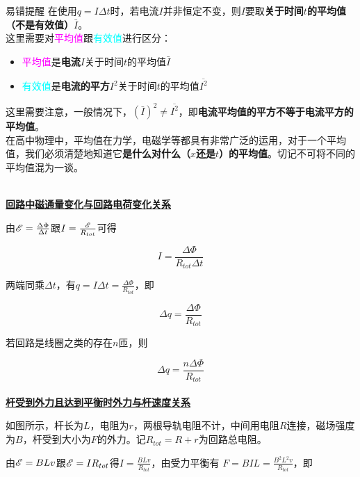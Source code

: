 \begin{mk}{易错提醒}{}
在使用$q = I \Delta t$时，若电流$I$并非恒定不变，则$I$要取\textbf{关于时间$t$的平均值（不是有效值）}$\bar I$。
~\\

这里需要对\textcolor{magenta}{平均值}跟\textcolor{cyan}{有效值}进行区分：
\begin{itemize}
\item \textcolor{magenta}{平均值}是\textbf{电流}$I$关于时间$t$的平均值$\bar I$
\item \textcolor{cyan}{有效值}是\textbf{电流的平方}$I^2$关于时间$t$的平均值$\overline{I^2}$
\end{itemize}
这里需要注意，一般情况下，$({\bar I})^2 \neq \overline{I^2}$，即\textbf{电流平均值的平方不等于电流平方的平均值}。
~\\

在高中物理中，平均值在力学，电磁学等都具有非常广泛的运用，对于一个平均值，我们必须清楚地知道它\textbf{是什么对什么（$x$还是$t$）的平均值}。切记不可将不同的平均值混为一谈。
\end{mk}
~\\

\noindent \uline{\textbf{回路中磁通量变化与回路电荷变化关系}}

由$\mathscr{E} = \frac{\Delta \Phi}{\Delta t}$跟$I = \frac{\mathscr{E}}{R_{tot}}$可得

$$I = \frac{\Delta \Phi}{R_{tot} \Delta t}$$

两端同乘$\Delta t$，有$q = I \Delta t = \frac{\Delta \Phi}{R_{tot}}$，即

\begin{equation}
\boxed{\Delta q = \frac{\Delta \Phi}{R_{tot}}}
\end{equation}

若回路是线圈之类的存在$n$匝，则

\begin{equation}
\boxed{\Delta q = \frac{n \Delta \Phi}{R_{tot}}}
\end{equation}
~\\

\noindent \uline{\textbf{杆受到外力且达到平衡时外力与杆速度关系}}


如图所示，杆长为$L$，电阻为$r$，两根导轨电阻不计，中间用电阻$R$连接，磁场强度为$B$，杆受到大小为$F$的外力。记$R_{tot} = R + r$为回路总电阻。

由$\mathscr{E} = BLv$跟$\mathscr{E} = I R_{tot}$得$I = \frac{BLv}{R_{tot}}$，由受力平衡有
$F = BIL = \frac{B^2 L^2 v}{R_{tot}}$，即

